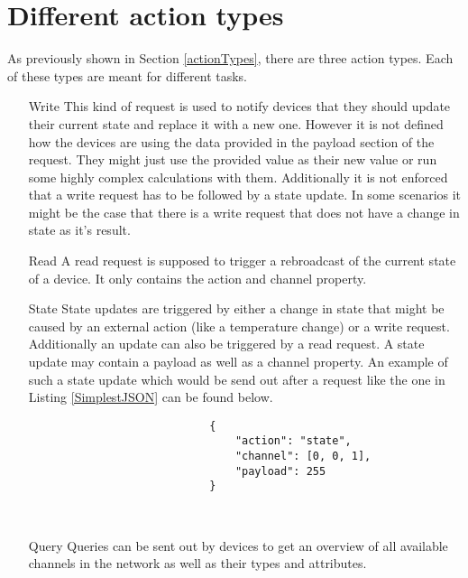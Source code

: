 \documentclass[11pt,a4paper, titlepage]{article}
\begin{document}
		\section[Actions]{Different action types}
			As previously shown in Section \ref{actionTypes}, there are three action types. Each of these types are meant for different tasks.
			\begin{itemize}
				\item[Write]
					This kind of request is used to notify devices that they should update their current state and replace it with a new one. However it is not defined how the devices are using the data provided in the payload section of the request. They might just use the provided value as their new value or run some highly complex calculations with them. Additionally it is not enforced that a write request has to be followed by a state update. In some scenarios it might be the case that there is a write request that does not have a change in state as it's result.
				\\
				\item[Read]
					A read request is supposed to trigger a rebroadcast of the current state of a device. It only contains the action and channel property.
				\\
				\item[State]
					State updates are triggered by either a change in state that might be caused by an external action (like a temperature change) or a write request. Additionally an update can also be triggered by a read request. A state update may contain a payload as well as a channel property. An example of such a state update which would be send out after a request like the one in Listing \ref{SimplestJSON} can be found below.
					\begin{listing}
						\begin{verbatim}
							{
								"action": "state",
								"channel": [0, 0, 1],
								"payload": 255
							}
						\end{verbatim}
						\caption{State update}
						\label{stateUpdate}
					\end{listing}
				\\
				\item[Query]
					Queries can be sent out by devices to get an overview of all available channels in the network as well as their types and attributes.
			\end{itemize}
		
\end{document}
